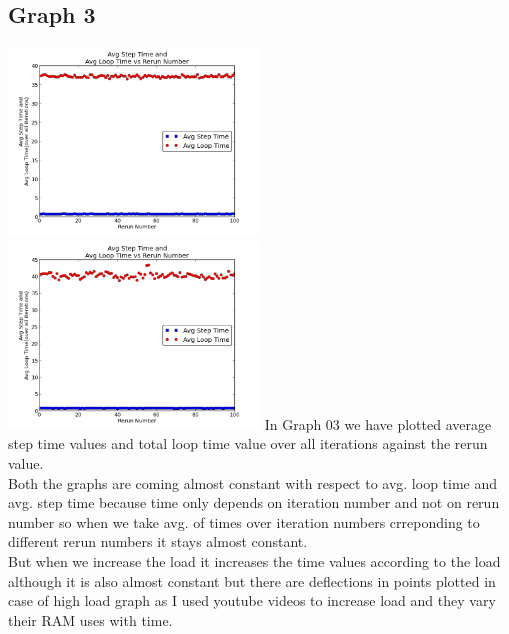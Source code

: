 \documentclass[11pt]{article}
\begin{document}
\subsection{Graph 3}
 \includegraphics[width=0.5\textwidth,keepaspectratio]{img/g08_plot03_1_low} \includegraphics[width=0.5\textwidth,keepaspectratio]{img/g08_plot03_1_high}
In Graph 03 we have plotted average step time values and total loop time value over all iterations against the rerun value.\\
Both the graphs are coming almost constant with respect to avg. loop time and avg. step time because time only depends on iteration number and not on rerun number so when we take avg. of times over iteration numbers crreponding to different rerun numbers it stays almost constant.\\  
But when we increase the load it increases the time values according to the load although it is also almost constant but there are deflections in points plotted in case of high load graph as I used youtube videos to increase load and they vary their RAM uses with time.\\
\end{document}
